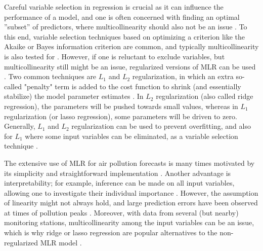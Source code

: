Careful variable selection in regression is crucial as it can influence the performance of a model, and one is often concerned with finding an optimal ”subset” of predictors, where multicollinearity should also not be an issue \cite{Montgomery2012}. To this end, variable selection techniques based on optimizing a criterion like the Akaike or Bayes information criterion are common, and typically multicollinearity is also tested for \cite{Montgomery2012}. However, if one is reluctant to exclude variables, but multicollinearity still might be an issue, regularized versions of MLR can be used \cite{Montgomery2012}. Two common techniques are $L_1$ and  $L_2$ regularization, in which an extra so-called "penalty" term is added to the cost function to shrink (and essentially stabilize) the model parameter estimates \cite{smlbook}. In $L_2$ regularization (also called ridge regression), the parameters will be pushed towards small values, whereas in $L_1$ regularization (or lasso regression), some parameters will be driven to zero. 
Generally, $L_1$ and $L_2$ regularization can be used to prevent overfitting, and also for $L_1$ where some input variables can be eliminated, as a variable selection technique \cite{smlbook}. 

The extensive use of MLR for air pollution forecasts is many times motivated by its simplicity and straightforward implementation \cite{atmos7020015}. Another advantage is interpretability; for example, inference can be made on all input variables, allowing one to investigate their individual importance \cite{Montgomery2012}. However, the assumption of linearity might not always hold, and large prediction errors have been observed at times of pollution peaks \cite{atmos7020015}. Moreover, with data from several (but nearby) monitoring stations, multicollinearity among the input variables can be an issue, which is why ridge or lasso regression are popular alternatives to the non-regularized MLR model \cite{atmos7020015}. 


